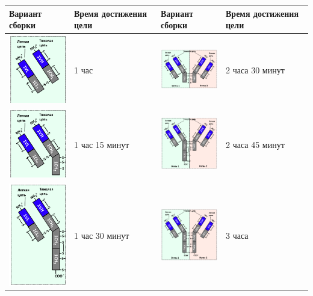 \begin{table}[H]
	\begin{center}
		\begin{tabular}{|p{3.5cm}|p{2.5cm}|p{3.5cm}|p{2.5cm}}
			\hline
			Вариант сборки&	Время достижения цели&	Вариант сборки&	Время достижения цели \\
			\hline
			\includegraphics[width=3cm]{6} & 1 час	& \includegraphics[width=3cm]{7} &	2 часа 30 минут \\
			\hline
			\includegraphics[width=3cm]{8} &1 час 15 минут & \includegraphics[width=3cm]{9} &2 часа 45 минут \\
			\hline
			\includegraphics[width=3cm]{10} & 1 час 30 минут& \includegraphics[width=3cm]{11} & 3 часа	\\
			\hline	
		\end{tabular}
	\end{center}
\end{table}


